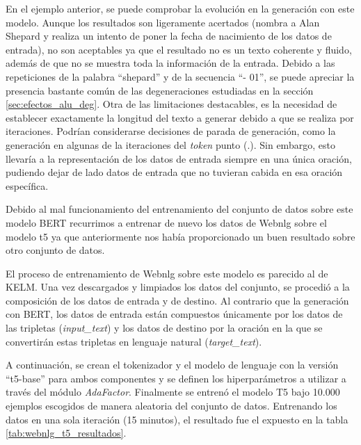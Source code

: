 En el ejemplo anterior, se puede comprobar la evolución en la generación con este modelo. Aunque los resultados son ligeramente acertados (nombra a Alan Shepard y realiza un intento de poner la fecha de nacimiento de los datos de entrada), no son aceptables ya que el resultado no es un texto coherente y fluido, además de que no se muestra toda la información de la entrada. Debido a las repeticiones de la palabra ``shepard'' y de la secuencia ``- 01'', se puede apreciar la presencia bastante común de las degeneraciones estudiadas en la sección \ref{sec:efectos_alu_deg}. Otra de las limitaciones destacables, es la necesidad de establecer exactamente la longitud del texto a generar debido a que se realiza por iteraciones. Podrían considerarse decisiones de parada de generación, como la generación en algunas de la iteraciones del \textit{token}  punto (.). Sin embargo, esto llevaría a la representación de los datos de entrada siempre en una única oración, pudiendo dejar de lado datos de entrada que no tuvieran cabida en esa oración específica.

Debido al mal funcionamiento del entrenamiento del conjunto de datos sobre este modelo BERT recurrimos a entrenar de nuevo los datos de Webnlg sobre el modelo t5 ya que anteriormente nos había proporcionado un buen resultado sobre otro conjunto de datos. 

El proceso de entrenamiento de Webnlg sobre este modelo es parecido al de KELM. Una vez descargados y limpiados los datos del conjunto, se procedió a la composición de los datos de entrada y de destino. Al contrario que la generación con BERT, los datos de entrada están compuestos únicamente por los datos de las tripletas (\textit{input\_text}) y los datos de destino por la oración en la que se convertirán estas tripletas en lenguaje natural (\textit{target\_text}).

A continuación, se crean el tokenizador y el modelo de lenguaje con la versión ``t5-base'' para ambos componentes y se definen los hiperparámetros a utilizar a través del módulo \textit{AdaFactor}. Finalmente se entrenó el modelo T5 bajo 10.000 ejemplos escogidos de manera aleatoria del conjunto de datos. 
Entrenando los datos en una sola iteración (15 minutos), el resultado fue el expuesto en la tabla \ref{tab:webnlg_t5_resultados}.



